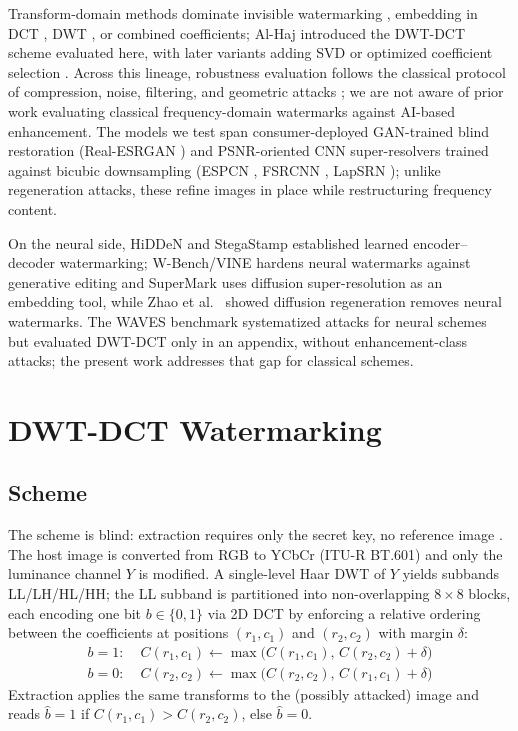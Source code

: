 \documentclass[conference]{IEEEtran}
\begin{document}
Transform-domain methods dominate invisible watermarking
\cite{cox2007}, embedding in DCT \cite{piva1997}, DWT \cite{barni2001},
or combined coefficients; Al-Haj \cite{alhaj2007} introduced the
DWT-DCT scheme evaluated here, with later variants adding SVD
\cite{navas2008} or optimized coefficient selection \cite{rijati2025}.
Across this lineage, robustness evaluation follows the classical
protocol of compression, noise, filtering, and geometric attacks
\cite{petitcolas1998}; we are not aware of prior work evaluating
classical frequency-domain watermarks against AI-based enhancement.
The models we test span consumer-deployed GAN-trained blind restoration
(Real-ESRGAN \cite{realesrgan2021}) and PSNR-oriented CNN
super-resolvers trained against bicubic downsampling (ESPCN
\cite{espcn2016}, FSRCNN \cite{fsrcnn2016}, LapSRN \cite{lapsrn2017});
unlike regeneration attacks, these refine images in place while
restructuring frequency content.

On the neural side, HiDDeN \cite{hidden2018} and StegaStamp
\cite{stegastamp2020} established learned encoder--decoder
watermarking; W-Bench/VINE \cite{wbench2024} hardens neural watermarks
against generative editing and SuperMark \cite{supermark2024} uses
diffusion super-resolution as an embedding tool, while Zhao et
al.~\cite{zhao2023} showed diffusion regeneration removes neural
watermarks. The WAVES benchmark \cite{waves2024} systematized attacks
for neural schemes but evaluated DWT-DCT only in an appendix, without
enhancement-class attacks; the present work addresses that gap for
classical schemes.

\section{DWT-DCT Watermarking}
\label{sec:background}

\subsection{Scheme}
The scheme is blind: extraction requires only the secret key, no
reference image \cite{cox2007}. The host image is converted from RGB to
YCbCr (ITU-R BT.601) and only the luminance channel $Y$ is modified. A
single-level Haar DWT of $Y$ yields subbands LL/LH/HL/HH; the LL
subband is partitioned into non-overlapping $8\times8$ blocks, each
encoding one bit $b \in \{0,1\}$ via 2D DCT by enforcing a relative
ordering between the coefficients at positions $(r_1,c_1)$ and
$(r_2,c_2)$ with margin $\delta$:
\begin{align}
b=1:\; & C(r_1,c_1) \leftarrow \max\!\big(C(r_1,c_1),\, C(r_2,c_2)+\delta\big) \\
b=0:\; & C(r_2,c_2) \leftarrow \max\!\big(C(r_2,c_2),\, C(r_1,c_1)+\delta\big)
\end{align}
Extraction applies the same transforms to the (possibly attacked)
image and reads $\hat{b} = 1$ if $C(r_1,c_1) > C(r_2,c_2)$, else
$\hat{b} = 0$.
\end{document}
